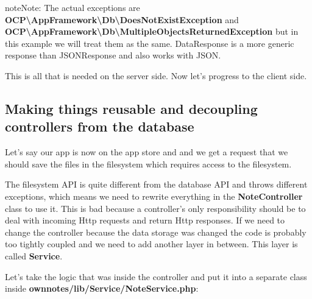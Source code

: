 \documentclass[letterpaper,10pt,english]{sphinxmanual}
\begin{document}
\begin{notice}{note}{Note:}
The actual exceptions are \textbf{OCP\textbackslash{}AppFramework\textbackslash{}Db\textbackslash{}DoesNotExistException} and \textbf{OCP\textbackslash{}AppFramework\textbackslash{}Db\textbackslash{}MultipleObjectsReturnedException} but in this example we will treat them as the same. DataResponse is a more generic response than JSONResponse and also works with JSON.
\end{notice}

This is all that is needed on the server side. Now let's progress to the client side.


\subsection{Making things reusable and decoupling controllers from the database}
\label{app/tutorial:making-things-reusable-and-decoupling-controllers-from-the-database}
Let's say our app is now on the app store and and we get a request that we should save the files in the filesystem which requires access to the filesystem.

The filesystem API is quite different from the database API and throws different exceptions, which means we need to rewrite everything in the \textbf{NoteController} class to use it. This is bad because a controller's only responsibility should be to deal with incoming Http requests and return Http responses. If we need to change the controller because the data storage was changed the code is probably too tightly coupled and we need to add another layer in between. This layer is called \textbf{Service}.

Let's take the logic that was inside the controller and put it into a separate class inside \textbf{ownnotes/lib/Service/NoteService.php}:
\end{document}
